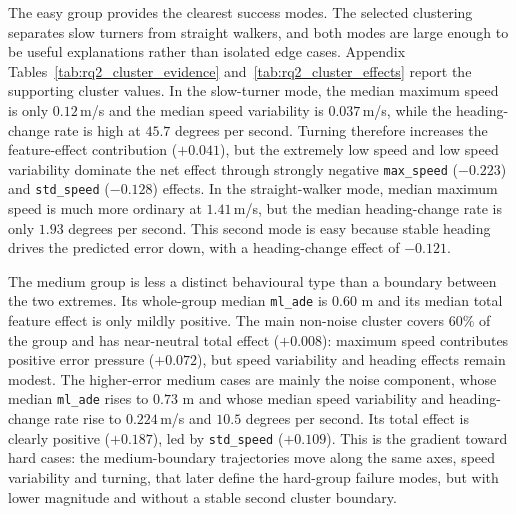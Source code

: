 \documentclass[12pt]{article}
\begin{document}
The easy group provides the clearest success modes. The selected clustering separates slow turners from straight walkers, and both modes are large enough to be useful explanations rather than isolated edge cases. Appendix Tables~\ref{tab:rq2_cluster_evidence} and~\ref{tab:rq2_cluster_effects} report the supporting cluster values. In the slow-turner mode, the median maximum speed is only $0.12$\,m/s and the median speed variability is $0.037$\,m/s, while the heading-change rate is high at $45.7$ degrees per second. Turning therefore increases the feature-effect contribution ($+0.041$), but the extremely low speed and low speed variability dominate the net effect through strongly negative \texttt{max\_speed} ($-0.223$) and \texttt{std\_speed} ($-0.128$) effects. In the straight-walker mode, median maximum speed is much more ordinary at $1.41$\,m/s, but the median heading-change rate is only $1.93$ degrees per second. This second mode is easy because stable heading drives the predicted error down, with a heading-change effect of $-0.121$.

The medium group is less a distinct behavioural type than a boundary between the two extremes. Its whole-group median \texttt{ml\_ade} is $0.60$ m and its median total feature effect is only mildly positive. The main non-noise cluster covers $60\%$ of the group and has near-neutral total effect ($+0.008$): maximum speed contributes positive error pressure ($+0.072$), but speed variability and heading effects remain modest. The higher-error medium cases are mainly the noise component, whose median \texttt{ml\_ade} rises to $0.73$ m and whose median speed variability and heading-change rate rise to $0.224$\,m/s and $10.5$ degrees per second. Its total effect is clearly positive ($+0.187$), led by \texttt{std\_speed} ($+0.109$). This is the gradient toward hard cases: the medium-boundary trajectories move along the same axes, speed variability and turning, that later define the hard-group failure modes, but with lower magnitude and without a stable second cluster boundary.
\end{document}
